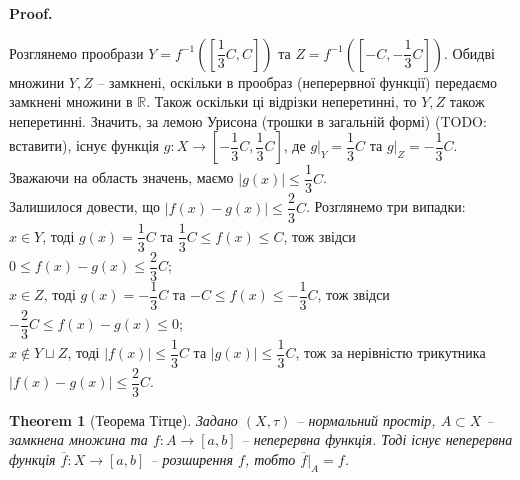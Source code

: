 \documentclass[a4paper, 10pt]{article}
\makeatletter
\theoremstyle{theoremdd}
\newtheorem{theorem}{Theorem}[subsection]
\renewenvironment{proof}[1][Proof.\\]{\par
\pushQED{\hfill \qed}%
\normalfont \topsep6\p@\@plus6\p@\relax
\trivlist
\item\relax
{\bfseries
#1\@addpunct{.}}\hspace\labelsep\ignorespaces
}{%
\popQED\endtrivlist\@endpefalse
}
\makeatother
\begin{document}
\begin{proof}
Розглянемо прообрази $Y = f^{-1}\left(\left[\dfrac{1}{3}C,C\right]\right)$ та $Z = f^{-1}\left(\left[-C, -\dfrac{1}{3}C \right]\right)$. Обидві множини $Y,Z$ -- замкнені, оскільки в прообраз (неперервної функції) передаємо замкнені множини в $\mathbb{R}$. Також оскільки ці відрізки неперетинні, то $Y,Z$ також неперетинні. Значить, за лемою Урисона (трошки в загальній формі) (TODO: вставити), існує функція $g \colon X \to \left[-\dfrac{1}{3}C, \dfrac{1}{3}C\right]$, де $g|_Y = \dfrac{1}{3}C$ та $g|_Z = -\dfrac{1}{3}C$. Зважаючи на область значень, маємо $|g(x)| \leq \dfrac{1}{3}C$. \\
Залишилося довести, що $|f(x) - g(x)| \leq \dfrac{2}{3}C$. Розглянемо три випадки:\\
$x \in Y$, тоді $g(x) = \dfrac{1}{3}C$ та $\dfrac{1}{3}C \leq f(x) \leq C$, тож звідси $0 \leq f(x) - g(x) \leq \dfrac{2}{3}C$;\\
$x \in Z$, тоді $g(x) = -\dfrac{1}{3}C$ та $-C \leq f(x) \leq -\dfrac{1}{3}C$, тож звідси $-\dfrac{2}{3}C \leq f(x) - g(x) \leq 0$;\\
$x \notin Y \sqcup Z$, тоді $|f(x)| \leq \dfrac{1}{3}C$ та $|g(x)| \leq \dfrac{1}{3}C$, тож за нерівністю трикутника $|f(x) - g(x)| \leq \dfrac{2}{3}C$.
\end{proof}

\begin{theorem}[Теорема Тітце]
Задано $(X,\tau)$ -- нормальний простір, $A \subset X$ -- замкнена множина та $f \colon A \to [a,b]$ -- неперервна функція. Тоді існує неперервна функція $\overline{f} \colon X \to [a,b]$ -- розширення $f$, тобто $\overline{f}|_{A} = f$.
\end{theorem}
\end{document}
